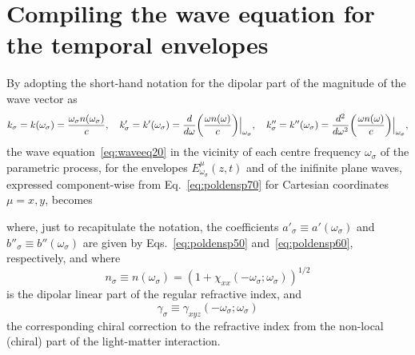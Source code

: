 \section{Compiling the wave equation for the temporal envelopes}
By adopting the short-hand notation for the dipolar part of the magnitude of
the wave vector as
$$
  k_{\sigma}=k(\omega_{\sigma})={{\omega_{\sigma} n(\omega_{\sigma})}\over{c}},\quad
  k'_{\sigma}=k'(\omega_{\sigma})={{d}\over{d\omega}}
           \bigg({{\omega n(\omega)}\over{c}}\bigg)\Big|_{\omega_{\sigma}},\quad
  k''_{\sigma}=k''(\omega_{\sigma})={{d^2}\over{d\omega^2}}
           \bigg({{\omega n(\omega)}\over{c}}\bigg)\Big|_{\omega_{\sigma}},
$$
the wave equation~\eqref{eq:waveeq20} in the vicinity of each centre frequency
$\omega_{\sigma}$ of the parametric process, for the envelopes
$E^{\mu}_{\omega_{\sigma}}(z,t)$ and of the inifinite plane waves, expressed
component-wise from Eq.~\eqref{eq:poldensp70} for Cartesian coordinates
$\mu=x,y$, becomes
\par{}\noindent
where, just to recapitulate the notation, the coefficients $a'_{\sigma}\equiv
a'(\omega_{\sigma})$ and $b''_{\sigma}\equiv b''(\omega_{\sigma})$ are given by
Eqs.~\eqref{eq:poldensp50} and~\eqref{eq:poldensp60}, respectively, and where
$$
  n_{\sigma}\equiv n(\omega_{\sigma})
    =(1+\chi_{xx}(-\omega_{\sigma};\omega_{\sigma}))^{1/2}
$$
is the dipolar linear part of the regular refractive index, and
$$
  \gamma_{\sigma}\equiv\gamma_{xyz}(-\omega_{\sigma};\omega_{\sigma})
$$
the corresponding chiral correction to the refractive index from the
non-local (chiral) part of the light-matter interaction.


